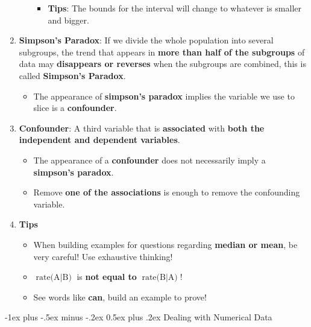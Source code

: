 \documentclass[10pt, landscape]{article}
\makeatletter
\renewcommand{\section}{\@startsection{section}{1}{0mm}%
                                {-1ex plus -.5ex minus -.2ex}%
                                {0.5ex plus .2ex}%
                                {\normalfont\large\bfseries}}
\makeatother
\begin{document}
\begin{multicols}{4}
\begin{enumerate}
\begin{itemize}
\begin{itemize}
                \item \textbf{Tips}: The bounds for the interval will change to whatever is smaller and bigger.
            \end{itemize}
    \end{itemize}
    \item \textbf{Simpson's Paradox}: If we divide the whole population into several subgroups, the trend that appears in \textbf{more than half of the subgroups} of data may \textbf{disappears or reverses} when the subgroups are combined, this is called \textbf{Simpson's Paradox}.
    \begin{itemize}
        \item The appearance of \textbf{simpson's paradox} implies the variable we use to slice is a \textbf{confounder}.
    \end{itemize}
    \item \textbf{Confounder}: A third variable that is \textbf{associated} with \textbf{both the independent and dependent variables}.
    \begin{itemize}
        \item The appearance of a \textbf{confounder} does not necessarily imply a \textbf{simpson's paradox}.
        \item Remove \textbf{one of the associations} is enough to remove the confounding variable.
    \end{itemize}
    \item \textbf{Tips}
    \begin{itemize}
        \item When building examples for questions regarding \textbf{median or mean}, be very careful! Use exhaustive thinking!
        \item $\text{rate(A}\mid\text{B)}$ is \textbf{not equal to} $\text{rate(B}\mid\text{A)}$!
        \item See words like \textbf{can}, build an example to prove!
    \end{itemize}
\end{enumerate}

\section{Dealing with Numerical Data}

\end{multicols}
\end{document}
